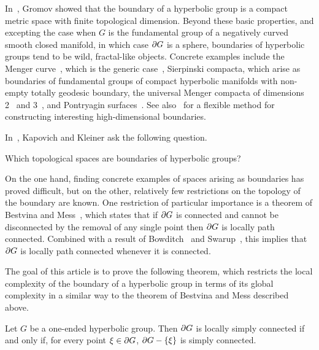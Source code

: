 \documentclass[a4paper]{article}
\begin{document}
In~\cite{gromov87}, Gromov showed that the boundary of a hyperbolic group is a
compact metric space with finite topological dimension. Beyond these basic
properties, and excepting the case when $G$ is the fundamental group of a
negatively curved smooth closed manifold, in which case $\partial G$ is a
sphere, boundaries of hyperbolic groups tend to be wild, fractal-like objects.
Concrete examples include the Menger curve~\cite{benakli92}, which is the
generic case~\cite{champetier95}, Sierpinski compacta, which arise as
boundaries of fundamental groups of compact hyperbolic manifolds with non-empty
totally geodesic boundary, the universal Menger compacta of dimensions
2~\cite{dranishnikov99} and 3~\cite{dymaraosajda07}, and Pontryagin
surfaces~\cite{dranishnikov99}. See also~\cite{davisjanuszkiewicz91} for a
flexible method for constructing interesting high-dimensional boundaries.

In~\cite{kapovichkleiner00}, Kapovich and Kleiner ask the following question.

\begin{question}\cite[Question A]{kapovichkleiner00}
  Which topological spaces are boundaries of hyperbolic groups?
\end{question}

On the one hand, finding concrete examples of spaces arising as boundaries has
proved difficult, but on the other, relatively few restrictions on the topology
of the boundary are known. One restriction of particular importance is a
theorem of Bestvina and Mess~\cite{bestvinamess91}, which states that if
$\partial G$ is connected and cannot be disconnected by the removal of any
single point then $\partial G$ is locally path connected. Combined with a
result of Bowditch~\cite{bowditch98b} and Swarup~\cite{swarup96}, this implies
that $\partial G$ is locally path connected whenever it is connected.

The goal of this article is to prove the following theorem, which restricts the
local complexity of the boundary of a hyperbolic group in terms of its global
complexity in a similar way to the theorem of Bestvina and Mess described
above. 

\begin{theorem}\label{thm:main_theorem}
  Let $G$ be a one-ended hyperbolic group. Then $\partial G$ is locally simply
  connected if and only if, for every point $\xi \in \partial G$,  $\partial
  G - \left\{\xi\right\}$ is simply connected.
\end{theorem}
\end{document}
